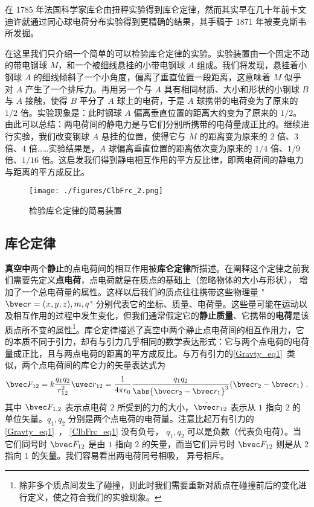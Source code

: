 

在 1785 年法国科学家库仑由扭秤实验得到库仑定律，然而其实早在几十年前卡文迪许就通过同心球电荷分布实验得到更精确的结果，其手稿于 1871 年被麦克斯韦所发掘。

在这里我们只介绍一个简单的可以检验库仑定律的实验。实验装置由一个固定不动的带电钢球 $M$，和一个被细线悬挂的小带电钢球 $A$ 组成。我们将发现，悬挂着小钢球 $A$ 的细线倾斜了一个小角度，偏离了垂直位置一段距离，这意味着 $M$ 似乎对 $A$ 产生了一个排斥力。再用另一个与 $A$ 具有相同材质、大小和形状的小钢球 $B$ 与 $A$ 接触，使得 $B$ 平分了 $A$ 球上的电荷，于是 $A$ 球携带的电荷变为了原来的 $1/2$ 倍。实验现象是：此时钢球 $A$ 偏离垂直位置的距离大约变为了原来的 $1/2$。由此可以总结：两电荷间的静电力是与它们分别所携带的电荷量成正比的。继续进行实验，我们改变钢球 $A$ 悬挂的位置，使得它与 $M$ 的距离变为原来的 $2$ 倍、$3$ 倍、$4$ 倍……实验结果是，$A$ 球偏离垂直位置的距离依次变为原来的 $1/4$ 倍、$1/9$ 倍、$1/16$ 倍。这启发我们得到静电相互作用的平方反比律，即两电荷间的静电力与距离的平方成反比。
\begin{figure}[ht]
\centering
\texttt{[image: ./figures/ClbFrc\_2.png]}
\caption{检验库仑定律的简易装置} \label{ClbFrc_fig1}
\end{figure}


\subsection{库仑定律}
\textbf{真空中}两个\textbf{静止}的点电荷间的相互作用被\textbf{库仑定律}所描述。在阐释这个定律之前我们需要先定义\textbf{点电荷}，点电荷就是在质点的基础上（忽略物体的大小与形状）， 增加了一个总电荷量的属性。这样以后我们的质点往往携带这些物理量 "$\bvec r=(x,y,z),m,q$" 分别代表它的坐标、质量、电荷量。这些量可能在运动以及相互作用的过程中发生变化，但我们通常假定它的\textbf{静止质量}、它携带的\textbf{电荷}是该质点所不变的属性\footnote{除非多个质点间发生了碰撞，则此时我们需要重新对质点在碰撞前后的变化进行定义，使之符合我们的实验现象。}。库仑定律描述了真空中两个静止点电荷间的相互作用力，它的本质不同于引力，却有与引力几乎相同的数学表达形式：它与两个点电荷的电荷量成正比，且与两点电荷的距离的平方成反比。与万有引力的\autoref{Gravty_eq1}~类似，两个点电荷间的库仑力的矢量表达式为
\begin{equation}\label{ClbFrc_eq1}
\bvec F_{12} = k\frac{q_1 q_2}{r_{12}^2} \uvec r_{12} = \frac{1}{4\pi\epsilon_0} \frac{q_1 q_2}{\abs{\bvec r_2 - \bvec r_1}^3}(\bvec r_2 - \bvec r_1)~.
\end{equation}
其中 $\bvec F_{1,2}$ 表示点电荷 $2$ 所受到的力的大小，$\hat{\bvec r}_{12}$ 表示从 $1$ 指向 $2$ 的单位矢量。$q_1, q_2$ 分别是两个点电荷的电荷量。注意比起万有引力的\autoref{Gravty_eq1}~， \autoref{ClbFrc_eq1} 没有负号， $q_1, q_2$ 可以是负数（代表负电荷）。当它们同号时 $\bvec F_{12}$ 是由 $1$ 指向 $2$ 的矢量，而当它们异号时 $\bvec F_{12}$ 则是从 $2$ 指向 $1$ 的矢量。我们容易看出两电荷同号相吸， 异号相斥。

